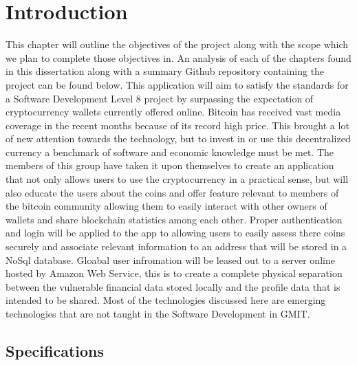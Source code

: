 \chapter{Introduction}
This chapter will outline the objectives of the project along with the scope which we plan to complete those objectives in. An analysis of each of the chapters found in this dissertation along with a summary Github repository containing the project can be found below. This application will aim to satisfy the standards for a Software Development Level 8 project by surpassing the expectation of cryptocurrency wallets currently offered online. Bitcoin has received vast media coverage in the recent months because of its record high price. This brought a lot of new attention towards the technology, but to invest in or use this decentralized currency a benchmark of software and economic knowledge must be met. The members of this group have taken it upon themselves to create an application that not only allows users to use the cryptocurrency in a practical sense, but will also educate the users about the coins and offer feature relevant to members of the bitcoin community allowing them to easily interact with other owners of wallets and share blockchain statistics among each other. Proper authentication and login will be applied to the app to allowing users to easily assess there coins securely and associate relevant information to an address that will be stored in a NoSql database. Gloabal user infromation will be leased out to a server online hosted by Amazon Web Service, this is to create a complete physical separation between the vulnerable financial data stored locally and the profile data that is intended to be shared. Most of the technologies discussed here are emerging technologies that are not taught in the Software Development in GMIT.

\section{Specifications}


